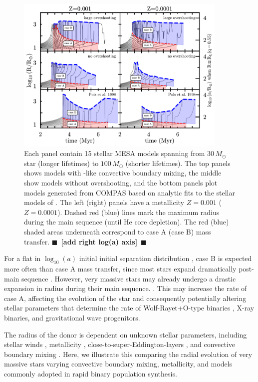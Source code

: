 \documentclass[twocolumn]{aastex631}
\newcommand{\todo}[1]{{\large $\blacksquare$~\textbf{\color{red}[#1]}}~$\blacksquare$}
\begin{document}
\begin{figure}[htbp]
  \centering
  \includegraphics[width=0.9\textwidth]{radii}
  \caption{Each panel contain 15 stellar \textsc{MESA} models spanning
    from $30 \, M_{\odot}$ star (longer lifetimes) to
    $100 \, M_{\odot}$ (shorter lifetimes). The top panels shows
    models with \cite{brott:11}-like convective boundary mixing, the
    middle show models without overshooting, and the bottom panels
    plot models generated from \textsc{COMPAS} based on analytic fits
    to the stellar models of \cite{pols:98}. The left (right) panels
    have a metallicity $Z=0.001$ ($Z=0.0001$). Dashed red (blue) lines
    mark the maximum radius during the main sequence (until He core
    depletion). The red (blue) shaded areas underneath correspond to
    case A (case B) mass transfer. \todo{add right log(a) axis}}
  \label{fig:radii}
\end{figure}


For a flat in $\log_{10}(a)$ initial initial separation distribution
\citep{opik:24}, case B is expected more often than case A mass
transfer, since most stars expand dramatically post-main sequence
\citep{vandenheuvel:69}. However, very massive stars may already
undergo a drastic expansion in radius during their main sequence.
\citep[e.g.,][]{sanyal:15, jiang:15, sabhahit:24}. This may increase
the rate of case A, affecting the evolution of the star and
consequently potentially altering stellar parameters that determine
the rate of Wolf-Rayet+O-type binaries \citep[e.g.,][]{nuijten:24},
X-ray binaries, and gravitational wave progenitors.

The radius of the
donor is dependent on unknown stellar parameters, including stellar
winds \citep{renzo:17, josiek:24}, metallicity \citep{xin:22},
close-to-super-Eddington-layers \citep[e.g.,][]{joss:73, paxton:13,
  jiang:15, agrawal:22, jermyn:23}, and convective boundary mixing
\citep{anders:23, johnston:24}. Here, we illustrate this comparing the
radial evolution of very massive stars varying convective boundary
mixing, metallicity, and models commonly adopted in rapid binary
population synthesis.
\end{document}
